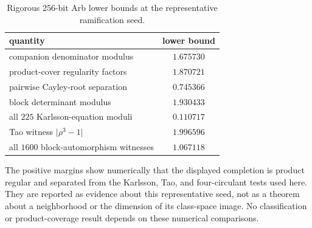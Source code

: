 \begin{table}[h]
\caption[Rigorous 256-bit Arb lower bounds at the representative ramification seed.]
{{Rigorous 256-bit Arb lower bounds at the representative ramification seed.}}
\label{tab:supp-ramification-bounds}
\centering
\renewcommand{\arraystretch}{1.12}
\begin{tabular}{|l|c|}
\hline
quantity & lower bound\\
\hline
companion denominator modulus & $1.675730$\\
\hline
product-cover regularity factors & $1.870721$\\
\hline
pairwise Cayley-root separation & $0.745366$\\
\hline
block determinant modulus & $1.930433$\\
\hline
all $225$ Karlsson-equation moduli & $0.110717$\\
\hline
Tao witness $\lvert\rho^3-1\rvert$ & $1.996596$\\
\hline
all $1600$ block-automorphism witnesses & $1.067118$\\
\hline
\end{tabular}
\end{table}
The positive margins show numerically that the displayed completion is product regular and separated from the Karlsson, Tao, and four-circulant tests used here. They are reported as evidence about this representative seed, not as a theorem about a neighborhood or the dimension of its class-space image. No classification or product-coverage result depends on these numerical comparisons.


\ifdefined\SupplementOnly

\fi
